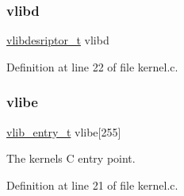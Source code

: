 \subsubsection{\texorpdfstring{vlibd}{vlibd}}
{\footnotesize\ttfamily \hyperlink{a00194_a2d9000b4fbb25c5ed2950a2d8f4921d5_a2d9000b4fbb25c5ed2950a2d8f4921d5}{vlibdesriptor\+\_\+t} vlibd}



Definition at line 22 of file kernel.\+c.

\mbox{\label{a00062_af69f4f709fdab28dec6b8fb75fb4d526_af69f4f709fdab28dec6b8fb75fb4d526}} 
\subsubsection{\texorpdfstring{vlibe}{vlibe}}
{\footnotesize\ttfamily \hyperlink{a00194_a97c1a7136f2ab06368e93c2d7533d619_a97c1a7136f2ab06368e93c2d7533d619}{vlib\+\_\+entry\+\_\+t} vlibe\mbox{[}255\mbox{]}}



The kernels C entry point. 



Definition at line 21 of file kernel.\+c.


